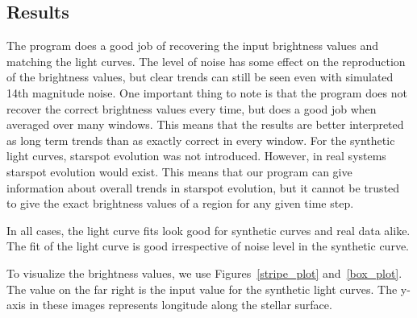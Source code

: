

\subsection{Results \label{results}}
The program does a good job of recovering the input brightness values and matching the light curves. The level of noise has some effect on the reproduction of the brightness values, but clear trends can still be seen even with simulated 14th magnitude noise. One important thing to note is that the program does not recover the correct brightness values every time, but does a good job when averaged over many windows. This means that the results are better interpreted as long term trends than as exactly correct in every window. For the synthetic light curves, starspot evolution was not introduced. However, in real systems starspot evolution would exist. This means that our program can give information about overall trends in starspot evolution, but it cannot be trusted to give the exact brightness values of a region for any given time step. 

In all cases, the light curve fits look good for synthetic curves and real data alike. The fit of the light curve is good irrespective of noise level in the synthetic curve.

To visualize the brightness values, we use Figures~\ref{stripe_plot} and~\ref{box_plot}. The value on the far right is the input value for the synthetic light curves. The y-axis in these images represents longitude along the stellar surface.

